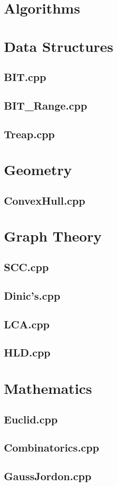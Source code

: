 \section{Algorithms}
\section{Data Structures}
\subsection{BIT.cpp}

\subsection{BIT\_Range.cpp}

\subsection{Treap.cpp}

\section{Geometry}
\subsection{ConvexHull.cpp}

\section{Graph Theory}
\subsection{SCC.cpp}

\subsection{Dinic's.cpp}

\subsection{LCA.cpp}

\subsection{HLD.cpp}

\section{Mathematics}
\subsection{Euclid.cpp}

\subsection{Combinatorics.cpp}

\subsection{GaussJordon.cpp}

